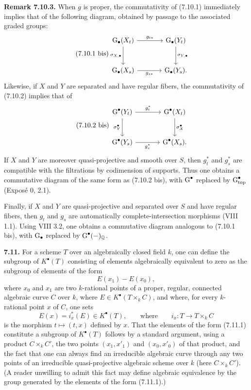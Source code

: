 \textbf{Remark 7.10.3.}
When $g$ is proper, the commutativity of (7.10.1) immediately implies that
of the following diagram, obtained by passage to the associated graded
groups:
\begin{equation}\tag{7.10.1 bis}
\begin{tikzcd}[column sep=large,row sep=large]
\Gr_\bullet(X_t) \arrow[r,"g_{t*}"]
  \arrow[d,"\sigma_{X,\bullet}"'] &
\Gr_\bullet(Y_t) \arrow[d,"\sigma_{Y,\bullet}"]\\
\Gr_\bullet(X_s) \arrow[r,"g_{s*}"'] & \Gr_\bullet(Y_s).
\end{tikzcd}
\end{equation}
Likewise, if $X$ and $Y$ are separated and have regular fibers, the
commutativity of (7.10.2) implies that of
\begin{equation}\tag{7.10.2 bis}
\begin{tikzcd}[column sep=large,row sep=large]
\Gr^\bullet(Y_t) \arrow[r,"g_t^*"] \arrow[d,"\sigma_Y^\bullet"'] &
\Gr^\bullet(X_t) \arrow[d,"\sigma_X^\bullet"]\\
\Gr^\bullet(Y_s) \arrow[r,"g_s^*"'] & \Gr^\bullet(X_s).
\end{tikzcd}
\end{equation}
If $X$ and $Y$ are moreover quasi-projective and smooth over $S$, then
$g_t^*$ and $g_s^*$ are compatible with the filtrations by codimension of
supports. Thus one obtains a commutative diagram of the same form as
(7.10.2 bis), with $\operatorname{G}^\bullet$ replaced by
$\operatorname{G}_{\mathrm{top}}^\bullet$ (Expos\'e 0, 2.1).

Finally, if $X$ and $Y$ are quasi-projective and separated over $S$ and have
regular fibers, then $g_t$ and $g_s$ are automatically complete-intersection
morphisms (VIII 1.1). Using VIII 3.2, one obtains a commutative diagram
analogous to (7.10.1 bis), with $\operatorname{G}_\bullet$ replaced by
$\operatorname{G}^\bullet(-)_{\mathbb Q}$.

\textbf{7.11.}
For a scheme $T$ over an algebraically closed field $k$, one can define the
subgroup of $K^\bullet(T)$ consisting of elements algebraically equivalent to
zero as the subgroup of elements of the form
\begin{equation}\tag{7.11.1}
E(x_1)-E(x_0),
\end{equation}
where $x_0$ and $x_1$ are two $k$-rational points of a proper, regular,
connected algebraic curve $C$ over $k$, where
$E\in K^\bullet(T\times_k C)$, and where, for every $k$-rational point $x$ of
$C$, one sets
\[
E(x)=i_x^*(E)\in K^\bullet(T),
\qquad\text{where}\qquad
i_x:T\longrightarrow T\times_k C
\]
is the morphism $t\mapsto(t,x)$ defined by $x$. That the elements of the form
(7.11.1) constitute a subgroup of $K^\bullet(T)$ follows by a standard
argument, using a product $C\times_k C'$, the two points
$(x_1,x'_1)$ and $(x_0,x'_0)$ of that product, and the fact that one can
always find an irreducible algebraic curve through any two points of an
irreducible quasi-projective algebraic scheme over $k$ (here
$C\times_k C'$). (A reader
unwilling to admit this fact may define algebraic equivalence by the group
generated by the elements of the form (7.11.1).)

